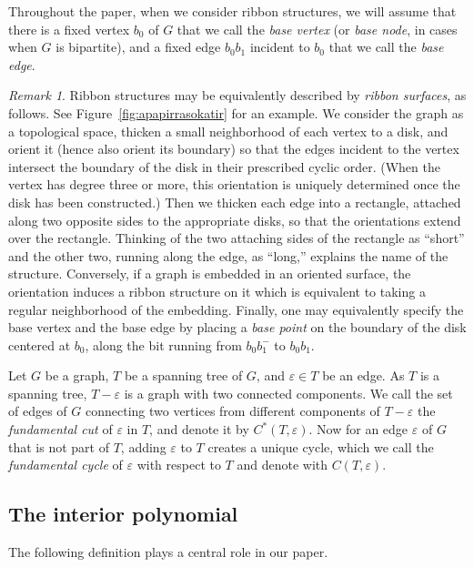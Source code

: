 \documentclass[10pt]{amsart}
\theoremstyle{definition}\newtheorem{defi}[theo]{Definition}
\theoremstyle{remark}\newtheorem{rema}[theo]{Remark}
\begin{document}
Throughout the paper, when we consider ribbon structures, we will assume that there is a fixed vertex $b_0$ of $G$ that we call the \emph{base vertex} (or \emph{base node}, in cases when $G$ is bipartite), and a fixed edge $b_0b_1$ incident to $b_0$ that we call the \emph{base edge}. 

\begin{rema}
\label{rem:surface}
Ribbon structures may be equivalently described by \emph{ribbon surfaces}, as follows. See Figure~\ref{fig:apapirrasokatir} for an example. We consider the graph as a topological space, thicken a small neighborhood of each vertex to a disk, and orient it (hence also orient its boundary) so that the edges incident to the vertex intersect the boundary of the disk in their prescribed cyclic order. (When the vertex has degree three or more, this orientation is uniquely determined once the disk has been constructed.) Then we thicken each edge into a rectangle, attached along two opposite sides to the appropriate disks, so that the orientations extend over the rectangle. Thinking of the two attaching sides of the rectangle as ``short'' and the other two, running along the edge, as ``long,'' explains the name of the structure. Conversely, if a graph is embedded in an oriented surface, the orientation induces a ribbon structure on it which is equivalent to taking a regular neighborhood of the embedding. Finally, one may equivalently specify the base vertex and the base edge by placing a \emph{base point} on the boundary of the disk centered at $b_0$, along the bit running from $b_0b_1^-$ to $b_0b_1$.
\end{rema}

Let $G$ be a graph, $T$ be a spanning tree of $G$, and $\varepsilon\in T$ be an edge. As $T$ is a spanning tree, $T-\varepsilon$ is a graph with two connected components. We call the set of edges of $G$ connecting two vertices from different components of $T-\varepsilon$ the \emph{fundamental cut} of $\varepsilon$ in $T$, and denote it by $C^*(T,\varepsilon)$. Now for an edge $\varepsilon$ of $G$ that is not part of $T$, adding $\varepsilon$ to $T$ creates a unique cycle, which we call the \emph{fundamental cycle} of $\varepsilon$ with respect to $T$ and denote with $C(T,\varepsilon)$.


\subsection{The interior polynomial}
\label{ssec:interior}

The following definition plays a central role in our paper. 
\end{document}
